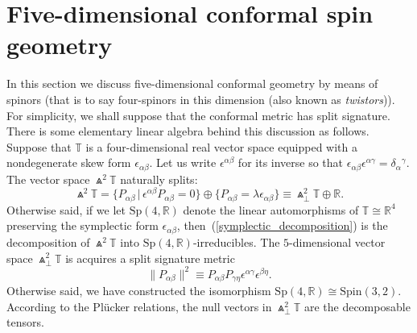 \documentclass[pdftex]{sigma}%
\numberwithin{equation}{section}
\begin{document}
\section{Five-dimensional conformal spin geometry}\label{5d_conformal}
In this section we discuss five-dimensional conformal geometry by means of
spinors (that is to say four-spinors in this dimension (also known as
{\em twistors})). For simplicity, we shall suppose that the conformal metric
has split signature. There is some elementary linear algebra behind this
discussion as follows. Suppose that ${\mathbb{T}}$ is a four-dimensional real
vector space equipped with a nondegenerate skew form $\epsilon_{\alpha\beta}$.
Let us write $\epsilon^{\alpha\beta}$ for its inverse so that
$\epsilon_{\alpha\beta}\epsilon^{\alpha\gamma}=\delta_\alpha{}^\gamma$. The
vector space $\Wedge^2{\mathbb{T}}$ naturally splits:
\begin{equation}\label{symplectic_decomposition}
\Wedge^2{\mathbb{T}}
=\big\{P_{\alpha\beta}\,|\,\epsilon^{\alpha\beta}P_{\alpha\beta}=0\big\}
\oplus\{P_{\alpha\beta}=\lambda\epsilon_{\alpha\beta}\}
\equiv\Wedge_\perp^2{\mathbb{T}}\oplus{\mathbb{R}}.\end{equation}
Otherwise said, if we let ${\mathrm{Sp}}(4,{\mathbb{R}})$ denote the linear
automorphisms of ${\mathbb{T}}\cong{\mathbb{R}}^4$ preserving the symplectic
form $\epsilon_{\alpha\beta}$, then~(\ref{symplectic_decomposition}) is the
decomposition of $\Wedge^2{\mathbb{T}}$ into
${\mathrm{Sp}}(4,{\mathbb{R}})$-irreducibles. The $5$-dimensional vector space
$\Wedge_\perp^2{\mathbb{T}}$ is acquires a split signature metric
\[\|P_{\alpha\beta}\|^2\equiv
P_{\alpha\beta}P_{\gamma\eta}\epsilon^{\alpha\gamma}\epsilon^{\beta\eta}.\]
Otherwise said, we have constructed the isomorphism
${\mathrm{Sp}}(4,{\mathbb{R}})\cong{\mathrm{Spin}}(3,2)$. According to the
Pl\"ucker relations, the null vectors in $\Wedge_\perp^2{\mathbb{T}}$ are
the decomposable tensors.
\end{document}
